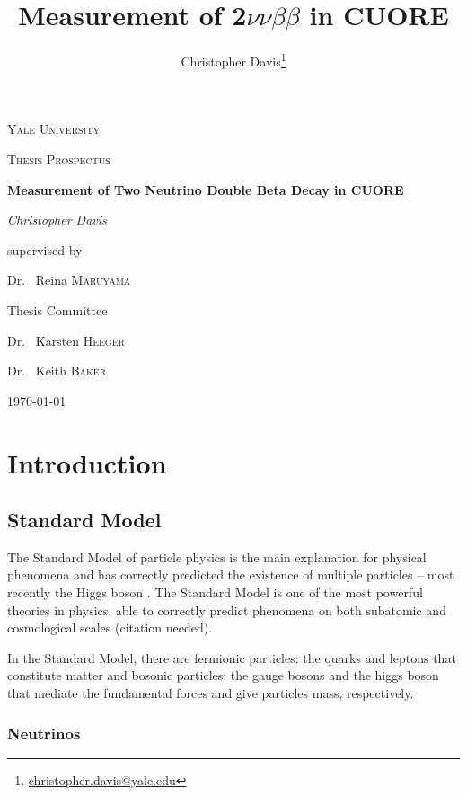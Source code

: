 \documentclass[12pt,a4paper]{article}
\author{Christopher Davis\thanks{\url{christopher.davis@yale.edu}}}
\title{Measurement of 2$\nu\nu\beta\beta$ in CUORE}
\begin{document}
\begin{titlepage}
\centering

{\scshape\LARGE Yale University \par}
\vspace{1 cm}
{\scshape\Large Thesis Prospectus \par}
\vspace{1.5 cm}
{\huge\bfseries Measurement of Two Neutrino Double Beta Decay in CUORE \par}
\vspace{2 cm}
{\Large\itshape Christopher Davis \par}
\vfill
supervised by \par
Dr. ~Reina \textsc{Maruyama}

\vfill
Thesis Committee \par
Dr. ~Karsten \textsc{Heeger} \par
Dr. ~Keith \textsc{Baker}

\vfill
{\large \today \par}
\end{titlepage}

\tableofcontents
\listoffigures

\doublespacing
\linenumbers

\section{Introduction}

\subsection{Standard Model}
The Standard Model of particle physics is the main explanation for physical phenomena and has correctly predicted the existence of multiple particles -- most recently the Higgs boson \cite{Higgs-ATLAS}\cite{Higgs-CMS}. The Standard Model is one of the most powerful theories in physics, able to correctly predict phenomena on both subatomic and cosmological scales (\color{blue}citation needed\color{black}).

In the Standard Model, there are fermionic particles: the quarks and leptons that constitute matter and bosonic particles: the gauge bosons and the higgs boson that mediate the fundamental forces and give particles mass, respectively. 

\subsubsection{Neutrinos}
\end{document}
